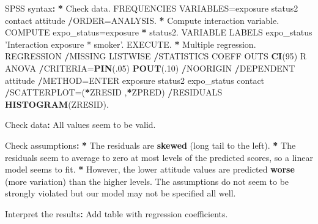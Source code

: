 \documentclass[a4paper]{book}
\newenvironment{Shaded}{\begin{snugshade}}{\end{snugshade}}
\newcommand{\KeywordTok}[1]{\textcolor[rgb]{0,0,0}{\textbf{#1}}}
\newcommand{\DecValTok}[1]{\textcolor[rgb]{0.00,0.00,0.00}{#1}}
\newcommand{\StringTok}[1]{\textcolor[rgb]{0.00,0.00,0.00}{#1}}
\newcommand{\OperatorTok}[1]{\textcolor[rgb]{0.00,0.00,0.00}{\textbf{#1}}}
\newcommand{\ErrorTok}[1]{\textcolor[rgb]{0.00,0.00,0.00}{\textbf{#1}}}
\newcommand{\NormalTok}[1]{#1}
\theoremstyle{definition}
\theoremstyle{definition}
\theoremstyle{definition}
\theoremstyle{remark}
\begin{document}
\begin{Shaded}
\begin{Highlighting}[]
\NormalTok{SPSS syntax}\OperatorTok{:}\StringTok{  }
\StringTok{  }
\ErrorTok{*}\StringTok{ }\NormalTok{Check data.  }
\NormalTok{FREQUENCIES VARIABLES=exposure status2 contact attitude  }
  \OperatorTok{/}\NormalTok{ORDER=ANALYSIS.  }
\OperatorTok{*}\StringTok{ }\NormalTok{Compute interaction variable.  }
\NormalTok{COMPUTE expo_status=exposure }\OperatorTok{*}\StringTok{ }\NormalTok{status2.  }
\NormalTok{VARIABLE LABELS  expo_status }\StringTok{'Interaction exposure * smoker'}\NormalTok{.  }
\NormalTok{EXECUTE.  }
\OperatorTok{*}\StringTok{ }\NormalTok{Multiple regression.  }
\NormalTok{REGRESSION  }
  \OperatorTok{/}\NormalTok{MISSING LISTWISE  }
  \OperatorTok{/}\NormalTok{STATISTICS COEFF OUTS }\KeywordTok{CI}\NormalTok{(}\DecValTok{95}\NormalTok{) R ANOVA  }
  \OperatorTok{/}\NormalTok{CRITERIA=}\KeywordTok{PIN}\NormalTok{(.}\DecValTok{05}\NormalTok{) }\KeywordTok{POUT}\NormalTok{(.}\DecValTok{10}\NormalTok{)  }
  \OperatorTok{/}\NormalTok{NOORIGIN   }
  \OperatorTok{/}\NormalTok{DEPENDENT attitude  }
  \OperatorTok{/}\NormalTok{METHOD=ENTER exposure status2 expo_status contact  }
  \OperatorTok{/}\NormalTok{SCATTERPLOT=(}\OperatorTok{*}\NormalTok{ZRESID ,}\OperatorTok{*}\NormalTok{ZPRED)  }
  \OperatorTok{/}\NormalTok{RESIDUALS }\KeywordTok{HISTOGRAM}\NormalTok{(ZRESID).  }
  
\NormalTok{Check data}\OperatorTok{:}\StringTok{  }
\StringTok{  }
\NormalTok{All values seem to be valid.  }
  
\NormalTok{Check assumptions}\OperatorTok{:}\StringTok{  }
\StringTok{  }
\ErrorTok{*}\StringTok{ }\NormalTok{The residuals are }\KeywordTok{skewed}\NormalTok{ (long tail to the left).}
\OperatorTok{*}\StringTok{ }\NormalTok{The residuals seem to average to zero at most levels of the predicted}
\NormalTok{scores, so a linear model seems to fit.}
\OperatorTok{*}\StringTok{ }\NormalTok{However, the lower attitude values are predicted }\KeywordTok{worse}\NormalTok{ (more variation) than}
\NormalTok{the higher levels. The assumptions do not seem to be strongly violated but our}
\NormalTok{model may not be specified all well.}
  
\NormalTok{Interpret the results}\OperatorTok{:}\StringTok{  }
\StringTok{  }
\NormalTok{Add table with regression coefficients.  }
  

\end{Highlighting}
\end{Shaded}
\end{document}
